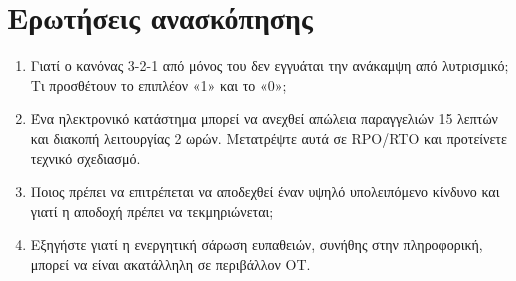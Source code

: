 \section*{Ερωτήσεις ανασκόπησης}
\begin{enumerate}
  \item Γιατί ο κανόνας 3-2-1 από μόνος του δεν εγγυάται την ανάκαμψη από λυτρισμικό; Τι προσθέτουν το επιπλέον «1» και το «0»;
  \item Ένα ηλεκτρονικό κατάστημα μπορεί να ανεχθεί απώλεια παραγγελιών 15 λεπτών και διακοπή λειτουργίας 2 ωρών. Μετατρέψτε αυτά σε RPO/RTO και προτείνετε τεχνικό σχεδιασμό.
  \item Ποιος πρέπει να επιτρέπεται να αποδεχθεί έναν υψηλό υπολειπόμενο κίνδυνο και γιατί η αποδοχή πρέπει να τεκμηριώνεται;
  \item Εξηγήστε γιατί η ενεργητική σάρωση ευπαθειών, συνήθης στην πληροφορική, μπορεί να είναι ακατάλληλη σε περιβάλλον OT.
\end{enumerate}
